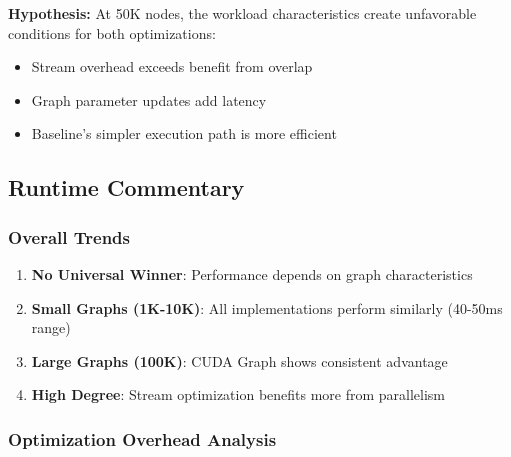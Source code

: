 \documentclass[11pt,a4paper]{article}
\begin{document}
\textbf{Hypothesis:} At 50K nodes, the workload characteristics create unfavorable conditions for both optimizations:
\begin{itemize}
    \item Stream overhead exceeds benefit from overlap
    \item Graph parameter updates add latency
    \item Baseline's simpler execution path is more efficient
\end{itemize}

\subsection{Runtime Commentary}

\subsubsection{Overall Trends}

\begin{enumerate}
    \item \textbf{No Universal Winner}: Performance depends on graph characteristics
    \item \textbf{Small Graphs (1K-10K)}: All implementations perform similarly (40-50ms range)
    \item \textbf{Large Graphs (100K)}: CUDA Graph shows consistent advantage
    \item \textbf{High Degree}: Stream optimization benefits more from parallelism
\end{enumerate}

\subsubsection{Optimization Overhead Analysis}
\end{document}
